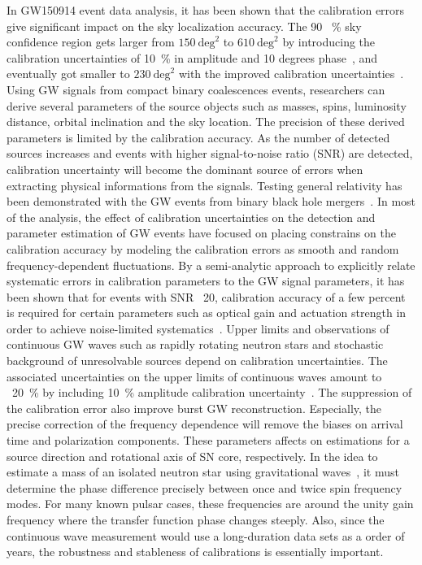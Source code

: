 \documentclass[%
 reprint,
superscriptaddress,
 amsmath,amssymb,
 aps,
]{revtex4-1}
\begin{document}
In GW150914 event data analysis, it has been shown that the calibration errors give significant impact on the sky localization accuracy.
The 90 ~\% sky confidence region gets larger from $150~\mathrm{deg}^2$ to $610~\mathrm{deg}^2$ by introducing the calibration uncertainties of 10~\% in amplitude and 10 degrees phase~\cite{PhysRevD.93.122004}, and eventually got smaller to $230~\mathrm{deg}^2$ with the improved calibration uncertainties~\cite{PhysRevX.6.041015, PhysRevD.96.102001}.
Using GW signals from compact binary coalescences events, researchers can derive several parameters of the source objects such as masses, spins, luminosity distance, orbital inclination and the sky location. 
The precision of these derived parameters is limited by the 
calibration accuracy. As the number of detected sources increases and events with higher signal-to-noise ratio (SNR) are detected, calibration uncertainty 
will become the dominant source of errors when extracting physical informations from the signals. 
Testing general relativity has been demonstrated with the GW events from binary black hole mergers~\cite{PhysRevLett.116.221101}. In most of the analysis, the effect of calibration uncertainties on the detection and parameter estimation of GW events have focused on placing constrains on the calibration accuracy by modeling the calibration errors as smooth and random frequency-dependent fluctuations. By a semi-analytic approach to explicitly relate systematic errors in calibration parameters to the GW signal parameters, it has been shown that for events with SNR ~20, calibration accuracy of a few percent is required for certain parameters such as optical gain and actuation strength in order to achieve noise-limited systematics~\cite{Hall:2017off}.
Upper limits and observations of continuous GW waves such as rapidly rotating neutron stars and stochastic background of unresolvable sources depend on calibration uncertainties. The associated uncertainties on the upper limits of continuous waves amount to ~20~\% by including 10~\% amplitude calibration uncertainty~\cite{0004-637X-839-1-12,PhysRevD.96.122004}.
The suppression of the calibration error also improve burst GW reconstruction.
Especially, the precise correction of the frequency dependence will remove the
biases on arrival time and polarization components. These parameters affects on
estimations for a source direction and rotational axis of SN core, respectively.
In the idea to estimate a mass of an isolated neutron star using gravitational waves~\cite{PhysRevD.91.084032,1742-6596-716-1-012026}, it must determine the phase difference precisely between once and twice spin frequency modes. For many known pulsar cases, these frequencies are around the unity gain frequency where the transfer function phase changes steeply. Also, since the continuous wave measurement would use a long-duration data sets as a order of years, the robustness and stableness of calibrations is essentially important.
\end{document}
